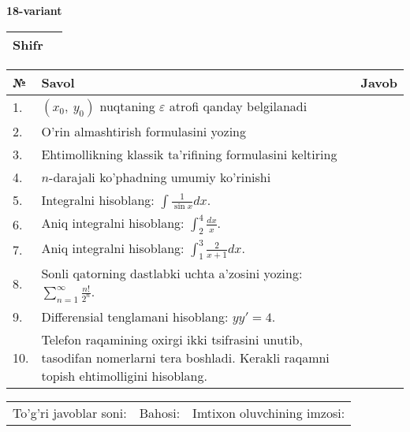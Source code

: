 \documentclass{article}
\begin{document}
  \egroup
  
  \newpage
  
  
  \textbf{18-variant}\\
  
  \bgroup
  \def\arraystretch{1.6} %
  
  \begin{tabular}{|m{5.7cm}|m{9.5cm}|}
  \hline
  Shifr & \\
  \hline
  \end{tabular}
  
  \vspace{1cm}
  
  \begin{tabular}{|m{0.7cm}|m{10cm}|m{4cm}|}
  \hline
  № & Savol & Javob \\
  \hline
  1. & \((x_{0},\ y_{0})\) nuqtaning \(\varepsilon\) atrofi qanday belgilanadi &  \\
  \hline
  2. & O'rin almashtirish formulasini yozing &  \\
  \hline
  3. & Ehtimollikning klassik ta'rifining formulasini keltiring &  \\
  \hline
  4. & \(n\)-darajali ko'phadning umumiy ko'rinishi &  \\
  \hline
  5. & Integralni hisoblang: \(\int {\frac{1}{\sin x}dx}\). &  \\
  \hline
  6. & Aniq integralni hisoblang: \(\int_{2}^{4}\frac{dx}{x}\). &  \\
  \hline
  7. & Aniq integralni hisoblang: \(\int_{1}^{3}\frac{2}{x + 1}dx\). &  \\
  \hline
  8. & Sonli qatorning dastlabki uchta a'zosini yozing: \(\sum_{n = 1}^{\infty}\frac{n!}{2^{n}}\). &  \\
  \hline
  9. & Differensial tenglamani hisoblang: \(yy' = 4\). &  \\
  \hline
  10. & Telefon raqamining oxirgi ikki tsifrasini unutib, tasodifan nomerlarni tera boshladi. Kerakli raqamni topish ehtimolligini hisoblang. &  \\
  \hline
  \end{tabular}
  
  \vspace{1cm}
  
  \begin{tabular}{lll}
  To'g'ri javoblar soni: \underline{\hspace{1.5cm}} & 
  Bahosi: \underline{\hspace{1.5cm}} & 
  Imtixon oluvchining imzosi: \underline{\hspace{2cm}} \\
  \end{tabular}
  
\end{document}
